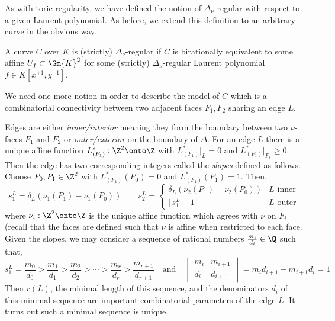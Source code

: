 \begin{rmk}
As with toric regularity, we have defined the notion of $\Delta_\nu$-regular with respect to a given Laurent polynomial. As before, we extend this definition to an arbitrary curve in the obvious way.
\end{rmk}

\begin{defn}
A curve $C$ over $K$ is (strictly) $\Delta_\nu$-regular if $C$ is birationally equivalent to some affine $U_f \subset \Gm{K}^2$ for some (strictly) $\Delta_\nu$-regular Laurent polynomial $f \in K[x^{\pm 1}, y^{\pm 1}]$. 
\end{defn}

\begin{rmk}
We need one more notion in order to describe the model of $C$ which is a combinatorial connectivity between two adjacent faces $F_1, F_2$ sharing an edge $L$. 
\end{rmk}

\begin{defn}[Slopes]
Edges are either \textit{inner/interior} meaning they form the boundary between two $\nu$-faces $F_1$ and $F_2$ or \textit{outer/exterior} on the boundary of $\Delta$. For an edge $L$ there is a unique affine function $L^*_{(F_1)} : \Z^2 \onto \Z$ with $L^*_{(F_1)} |_L = 0$ and $L^*_{(F_1)}|_{F_1} \ge 0$. Then the edge has two corresponding integers called the \textit{slopes} defined as follows. Choose $P_0, P_1 \in \Z^2$ with $L^*_{(F_1)}(P_0) = 0$ and $L_{(F_1)}^*(P_1) =1$. Then,
\[ s_1^L = \delta_L (\nu_1(P_1) - \nu_1(P_0)) \quad \quad s_2^L = 
\begin{cases}
\delta_L (\nu_2(P_1) - \nu_2(P_0)) & L \text{ inner}
\\
\lfloor s_1^L - 1 \rfloor & L \text{ outer}
\end{cases} \]
where $\nu_i : \Z^2 \onto \Z$ is the unique affine function which agrees with $\nu$ on $F_i$ (recall that the faces are defined such that $\nu$ is affine when restricted to each face. Given the slopes, we may consider a sequence of rational numbers $\frac{m_i}{d_i} \in \Q$ such that,
\[ s_1^L = \frac{m_0}{d_0} > \frac{m_1}{d_1} > \frac{m_2}{d_2} > \cdots > \frac{m_r}{d_r} > \frac{m_{r+1}}{d_{r+1}} \quad \text{and} \quad 
\begin{vmatrix}
m_i & m_{i+1}
\\
d_i & d_{i+1}
\end{vmatrix} = m_i d_{i+1} - m_{i+1} d_i = 1 \]
Then $r(L)$, the minimal length of this sequence, and the denominators $d_i$ of this minimal sequence are important combinatorial parameters of the edge $L$. It turns out such a minimal sequence is unique.
\end{defn}

